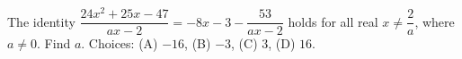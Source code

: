 The identity $\dfrac{24x^2+25x-47}{ax-2}=-8x-3-\dfrac{53}{ax-2}$ holds for all real $x\ne\dfrac{2}{a}$, where $a\ne0$. Find $a$. Choices: (A) $-16$, (B) $-3$, (C) $3$, (D) $16$.
